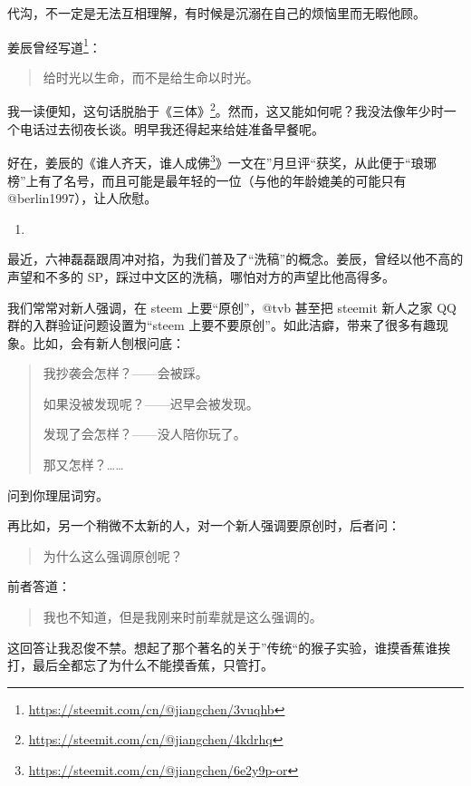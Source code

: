 \documentclass[]{ctexbook}
\renewcommand{\href}[2]{#2\footnote{\url{#1}}}
\begin{document}
代沟，不一定是无法互相理解，有时候是沉溺在自己的烦恼里而无暇他顾。

姜辰曾经\href{https://steemit.com/cn/@jiangchen/3vuqhb}{写道}：

\begin{quote}
给时光以生命，而不是给生命以时光。
\end{quote}

我一读便知，这句话脱胎于\href{https://steemit.com/cn/@jiangchen/4kdrhq}{《三体》}。然而，这又能如何呢？我没法像年少时一个电话过去彻夜长谈。明早我还得起来给娃准备早餐呢。

好在，姜辰的《\href{https://steemit.com/cn/@jiangchen/6e2y9p-or}{谁人齐天，谁人成佛}》一文在''月旦评``获奖，从此便于``琅琊榜''上有了名号，而且可能是最年轻的一位（与他的年龄媲美的可能只有 @berlin1997），让人欣慰。

\begin{enumerate}
\def\labelenumi{(\arabic{enumi})}
\setcounter{enumi}{3}
\item
\end{enumerate}

最近，六神磊磊跟周冲对掐，为我们普及了``洗稿''的概念。姜辰，曾经以他不高的声望和不多的 SP，踩过中文区的洗稿，哪怕对方的声望比他高得多。

我们常常对新人强调，在 steem 上要``原创''，@tvb 甚至把 steemit 新人之家 QQ 群的入群验证问题设置为``steem 上要不要原创''。如此洁癖，带来了很多有趣现象。比如，会有新人刨根问底：

\begin{quote}
我抄袭会怎样？------会被踩。

如果没被发现呢？------迟早会被发现。

发现了会怎样？------没人陪你玩了。

那又怎样？\ldots{}\ldots{}
\end{quote}

问到你理屈词穷。

再比如，另一个稍微不太新的人，对一个新人强调要原创时，后者问：

\begin{quote}
为什么这么强调原创呢？
\end{quote}

前者答道：

\begin{quote}
我也不知道，但是我刚来时前辈就是这么强调的。
\end{quote}

这回答让我忍俊不禁。想起了那个著名的关于''传统``的猴子实验，谁摸香蕉谁挨打，最后全都忘了为什么不能摸香蕉，只管打。
\end{document}
